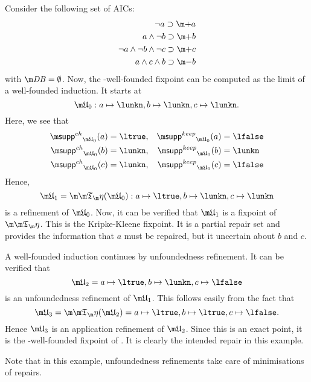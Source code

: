 \begin{example}
 Consider the following set \aics of AICs:
\begin{align*}
 \lnot a \aicrule \add a\\
 a \land \lnot b \aicrule \add b\\
 \lnot a \land \lnot b \land \lnot c \aicrule \add c\\
 a \land c \land b \aicrule \remove b
\end{align*} with $\db = \emptyset$.
Now, the \Ap-well-founded fixpoint can be computed as the limit of a well-founded induction. It starts at
\[\UUU_0: a\mapsto \lunkn, b\mapsto \lunkn, c\mapsto\lunkn.\]
Here, we see that 
\begin{align*}
 \suppin_{\UUU_0}(a) &= \ltrue, & \suppout_{\UUU_0}(a) &=\lfalse \\
 \suppin_{\UUU_0}(b) &= \lunkn, & \suppout_{\UUU_0}(b) &=\lunkn \\
 \suppin_{\UUU_0}(c) &= \lunkn, & \suppout_{\UUU_0}(c) &=\lfalse 
\end{align*}
Hence, 
\[\UUU_1 = \Ap(\UUU_0): a\mapsto \ltrue, b\mapsto \lunkn, c\mapsto\lunkn\]
is a refinement of $\UUU_0$. 
Now, it can be verified that $\UUU_1$ is a fixpoint of $\Ap$. This is the Kripke-Kleene fixpoint. It is a partial repair set and provides the information that $a$ must be repaired, but it uncertain about $b$ and $c$. 

A well-founded induction continues by unfoundedness refinement. 
It can be verified that 
\[\UUU_2 = a\mapsto \ltrue, b\mapsto \lunkn, c\mapsto\lfalse\]
is an unfoundedness refinement of $\UUU_1$.
This follows easily from the fact that 
\[\UUU_3 = \Ap(\UUU_2)= a\mapsto \ltrue, b\mapsto \ltrue, c\mapsto\lfalse.\]
Hence $\UUU_3$ is an application refinement of $\UUU_2$. Since this is an exact point, it is the \Ap-well-founded fixpoint of \Op. It is clearly the intended repair in this example.

Note that in this example, unfoundedness refinements take care of minimisations of repairs.  
\end{example}

